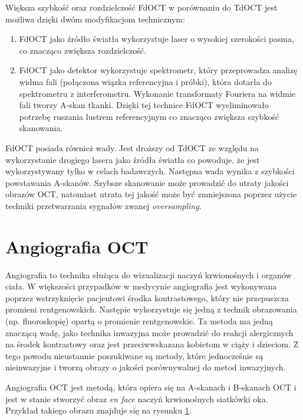 Większa szybkość oraz rozdzielczość FdOCT w porównaniu do TdOCT jest możliwa dzięki dwóm modyfikacjom technicznym:

\begin{enumerate}

\item FdOCT jako źródło światła wykorzystuje laser o wysokiej szerokości pasma, co znacząco zwiększa rozdzielczość.
\item FdOCT jako detektor wykorzystuje spektrometr, który przeprowadza analizę widma fali (połączona wiązka referencyjna i próbki), która dotarła do spektrometru z interferometru. Wykonanie transformaty Fouriera na widmie fali tworzy A-skan tkanki. Dzięki tej technice FdOCT wyeliminowało potrzebę ruszania lustrem referencyjnym co znacząco zwiększa szybkość skanowania.

\end{enumerate}

FdOCT posiada również wady. Jest droższy od TdOCT ze względu na wykorzystanie drogiego lasera jako źródła światła co powoduje, że jest wykorzystywany tylko w celach badawczych. Następna wada wynika z szybkości powstawania A-skanów. Szybsze skanowanie może prowadzić do utraty jakości obrazów OCT, natomiast utrata tej jakość może być zmniejszona poprzez użycie techniki przetwarzania sygnałów zwanej \textit{oversampling}.


\section{Angiografia OCT}
\label{sec:obrazowanie_oct:angiografia_oct}

Angiografia to technika służąca do wizualizacji naczyń krwionośnych i organów ciała. W większości przypadków w medycynie angiografia jest wykonywana poprzez wstrzyknięcie pacjentowi środka kontrastowego, który nie przepuszcza promieni rentgenowskich. Następie wykorzystuje się jedną z technik obrazowania (np. fluoroskopię) opartą o promienie rentgenowskie. Ta metoda ma jedną znaczącą wadę, jako technika inwazyjna może prowadzić do reakcji alergicznych na środek kontrastowy oraz jest przeciwwskazana kobietom w ciąży i dzieciom. Z tego powodu nieustannie poszukiwane są metody, które jednocześnie są nieinwazyjne i tworzą obrazy o jakości porównywalnej do metod inwazyjnych.

Angiografia OCT jest metodą, która opiera się na A-skanach i B-skanach OCT i jest w stanie stworzyć obraz \textit{en face} naczyń krwionośnych siatkówki oka. Przykład takiego obrazu znajduje się na rysunku \ref{sec:obrazowanie_oct:angiografia_oct}.

